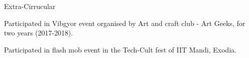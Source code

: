 \documentclass{resume} %
\begin{document}
\begin{rSection}{Extra-Cirrucular} \itemsep -3pt
\item Participated in Vibgyor event organised by Art and craft club - Art Geeks, for two years (2017-2018).
\item Participated in flash mob event in the Tech-Cult fest of IIT Mandi, Exodia.

\end{rSection}
\end{document}
